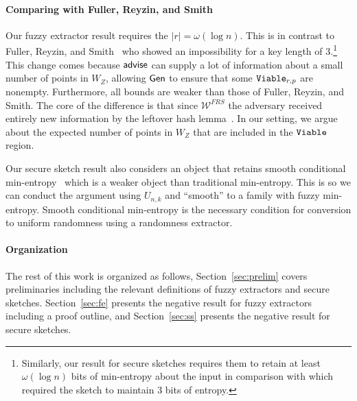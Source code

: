 \paragraph{Comparing with Fuller, Reyzin, and Smith~\cite{fuller2020computational}}
Our fuzzy extractor result requires the $|r| = \omega(\log n)$.  This is in contrast to Fuller, Reyzin, and Smith~\cite{fuller2020computational} who showed an impossibility for a key length of $3$.\footnote{Similarly, our result for secure sketches requires them to retain at least $\omega(\log n)$ bits of min-entropy about the input in comparison with \cite{fuller2020computational} which required the sketch to maintain $3$ bits of entropy.} This change comes because ${\mathsf{advise}}$ can supply a lot of information about a small number of points in $W_Z$, allowing ${\mathsf{Gen}}$ to ensure that some $\mathtt{Viable}_{r,p}$ are nonempty. Furthermore, all bounds are weaker than those of Fuller, Reyzin, and Smith.  The core of the difference is that since $\mathcal{W}^{FRS}$ the adversary received entirely new information by the leftover hash lemma~\cite{haastad1993construction,barak2011leftover}. In our setting, we argue about the expected number of points in $W_Z$ that are included in the $\mathtt{Viable}$ region. 

Our secure sketch result also considers an object that retains smooth conditional min-entropy~\cite{renner2005simple} which is a weaker object than traditional min-entropy.  This is so we can conduct the argument using $U_{n,k}$ and ``smooth'' to a family with fuzzy min-entropy. Smooth conditional min-entropy is the necessary condition for conversion to uniform randomness using a randomness extractor. 



\paragraph{Organization} The rest of this work is organized as follows, Section~\ref{sec:prelim} covers preliminaries including the relevant definitions of fuzzy extractors and secure sketches.  Section~\ref{sec:fe} presents the negative result for fuzzy extractors including a proof outline, and Section~\ref{sec:ss} presents the negative result for secure sketches.


